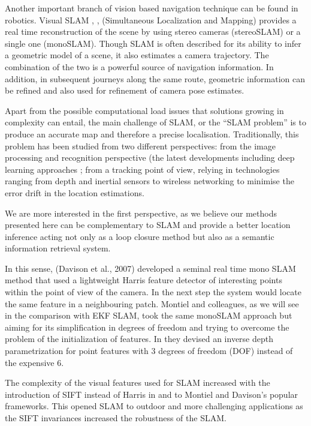 Another important branch of vision based navigation technique can be found in robotics. Visual SLAM \citep{konolige2007frame}, \citep{engelhard2011real},\citep{neira2008guest} (Simultaneous Localization and Mapping) provides a real time reconstruction of the scene by using stereo cameras (stereoSLAM) or a single one (monoSLAM). Though SLAM is often described for its ability to infer a geometric model of a scene, it also estimates a camera trajectory.  The combination of the two is a powerful source of navigation information. In addition, in subsequent journeys along the same route, geometric information can be refined and also used for refinement of camera pose estimates.

Apart from the possible computational load issues that solutions growing in complexity can entail, the main challenge of SLAM, or the ``SLAM problem'' is to produce an accurate map and therefore a precise localisation. Traditionally, this problem has been studied from two different perspectives: from the image processing and recognition perspective (the latest developments including deep learning approaches \citep{2014convolutional}; from a tracking point of view, relying in technologies ranging from depth and inertial sensors to wireless networking to minimise the error drift in the location estimations.

We are more interested in the first perspective, as we believe our methods presented here can be complementary to SLAM and provide a better location inference acting not only as a loop closure method \citep{glover2012openfabmap} but also as a semantic information retrieval system. 

In this sense, (Davison et al., 2007) developed a seminal real time mono SLAM method that used a lightweight Harris feature detector of interesting points within the point of view of the camera. In the next step the system would locate the same feature in a neighbouring patch. Montiel and colleagues, as we will see in the comparison with EKF SLAM, took the same monoSLAM approach but aiming for its simplification in degrees of freedom and trying to overcome the problem of the initialization of features. In \citep{montiel2006unified} they devised an inverse depth parametrization for point features with 3 degrees of freedom (DOF) instead of the expensive 6.

The complexity of the visual features used for SLAM increased with the introduction of SIFT instead of Harris in \citep{chen2007sift} and \citep{suzuki2011development} to Montiel and Davison's popular frameworks. This opened SLAM to outdoor and more challenging applications as the SIFT invariances increased the robustness of the SLAM.

